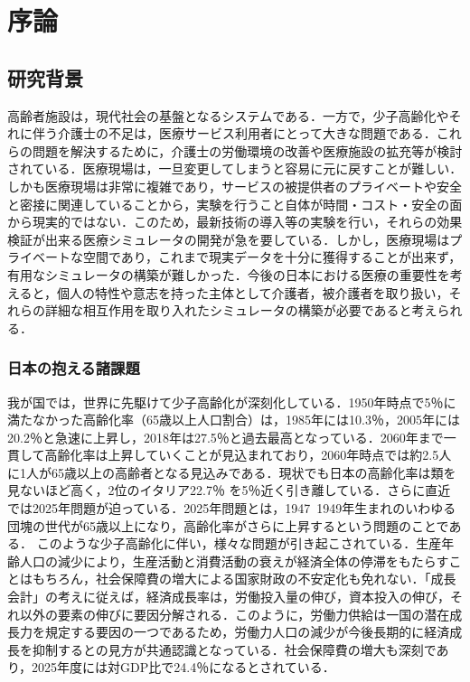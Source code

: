 \chapter{序論}

\section{研究背景}

高齢者施設は，現代社会の基盤となるシステムである．一方で，少子高齢化やそれに伴う介護士の不足は，医療サービス利用者にとって大きな問題である．これらの問題を解決するために，介護士の労働環境の改善や医療施設の拡充等が検討されている．医療現場は，一旦変更してしまうと容易に元に戻すことが難しい．しかも医療現場は非常に複雑であり，サービスの被提供者のプライベートや安全と密接に関連していることから，実験を行うこと自体が時間・コスト・安全の面から現実的ではない．このため，最新技術の導入等の実験を行い，それらの効果検証が出来る医療シミュレータの開発が急を要している．しかし，医療現場はプライベートな空間であり，これまで現実データを十分に獲得することが出来ず，有用なシミュレータの構築が難しかった．今後の日本における医療の重要性を考えると，個人の特性や意志を持った主体として介護者，被介護者を取り扱い，それらの詳細な相互作用を取り入れたシミュレータの構築が必要であると考えられる．

\subsection{日本の抱える諸課題}

我が国では，世界に先駆けて少子高齢化が深刻化している．1950年時点で5％に満たなかった高齢化率（65歳以上人口割合）は，1985年には10.3％，2005年には20.2％と急速に上昇し，2018年は27.5％と過去最高となっている．2060年まで一貫して高齢化率は上昇していくことが見込まれており，2060年時点では約2.5人に1人が65歳以上の高齢者となる見込みである\cite{ex_kousei_v1}．現状でも日本の高齢化率は類を見ないほど高く，2位のイタリア22.7％ を5％近く引き離している．さらに直近では2025年問題が迫っている．2025年問題とは，1947~1949年生まれのいわゆる団塊の世代が65歳以上になり，高齢化率がさらに上昇するという問題のことである\cite{2025_problem}．
このような少子高齢化に伴い，様々な問題が引き起こされている．生産年齢人口の減少により，生産活動と消費活動の衰えが経済全体の停滞をもたらすことはもちろん，社会保障費の増大による国家財政の不安定化も免れない．「成長会計」の考えに従えば，経済成長率は，労働投入量の伸び，資本投入の伸び，それ以外の要素の伸びに要因分解される．このように，労働力供給は一国の潜在成長力を規定する要因の一つであるため，労働力人口の減少が今後長期的に経済成長を抑制するとの見方が共通認識となっている\cite{population_GDP_relation}．社会保障費の増大も深刻であり，2025年度には対GDP比で24.4％になるとされている\cite{social_security}．

